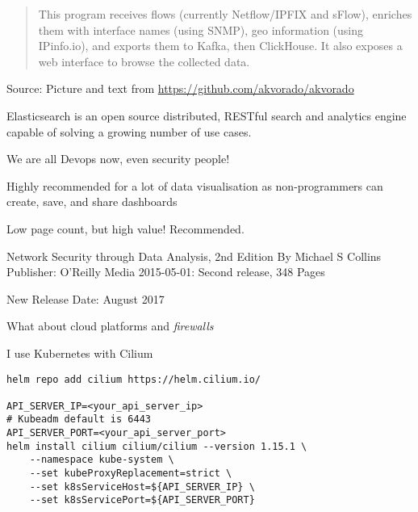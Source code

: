 \documentclass[Screen16to9,17pt]{foils}
\begin{document}


\begin{quote}
This program receives flows (currently Netflow/IPFIX and sFlow), enriches them with interface names (using SNMP), geo information (using IPinfo.io), and exports them to Kafka, then ClickHouse. It also exposes a web interface to browse the collected data.
\end{quote}
Source: Picture and text from \url{https://github.com/akvorado/akvorado}




Elasticsearch is an open source distributed, RESTful search and analytics engine capable of solving a growing number of use cases.


\centerline{We are all Devops now, even security people!}

Highly recommended for a lot of data visualisation as non-programmers can create, save, and share dashboards




Low page count, but high value! Recommended.

Network Security through Data Analysis, 2nd Edition
By Michael S Collins
Publisher: O'Reilly Media
2015-05-01: Second release, 348 Pages

New Release Date: August 2017



What about cloud platforms and \emph{firewalls}

I use Kubernetes with Cilium

\begin{verbatim}
helm repo add cilium https://helm.cilium.io/

API_SERVER_IP=<your_api_server_ip>
# Kubeadm default is 6443
API_SERVER_PORT=<your_api_server_port>
helm install cilium cilium/cilium --version 1.15.1 \
    --namespace kube-system \
    --set kubeProxyReplacement=strict \
    --set k8sServiceHost=${API_SERVER_IP} \
    --set k8sServicePort=${API_SERVER_PORT}
\end{verbatim}
\end{document}
